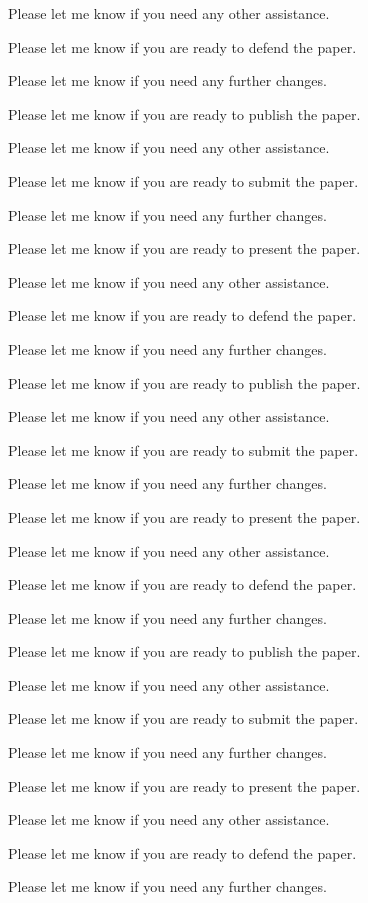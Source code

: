 Please let me know if you need any other assistance. 

Please let me know if you are ready to defend the paper. 

Please let me know if you need any further changes. 

Please let me know if you are ready to publish the paper. 

Please let me know if you need any other assistance. 

Please let me know if you are ready to submit the paper. 

Please let me know if you need any further changes. 

Please let me know if you are ready to present the paper. 

Please let me know if you need any other assistance. 

Please let me know if you are ready to defend the paper. 

Please let me know if you need any further changes. 

Please let me know if you are ready to publish the paper. 

Please let me know if you need any other assistance. 

Please let me know if you are ready to submit the paper. 

Please let me know if you need any further changes. 

Please let me know if you are ready to present the paper. 

Please let me know if you need any other assistance. 

Please let me know if you are ready to defend the paper. 

Please let me know if you need any further changes. 

Please let me know if you are ready to publish the paper. 

Please let me know if you need any other assistance. 

Please let me know if you are ready to submit the paper. 

Please let me know if you need any further changes. 

Please let me know if you are ready to present the paper. 

Please let me know if you need any other assistance. 

Please let me know if you are ready to defend the paper. 

Please let me know if you need any further changes. 

